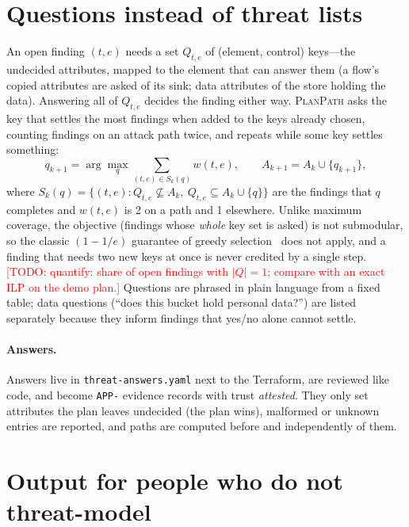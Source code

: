 \documentclass[sigconf,review,anonymous]{acmart}
\newcommand{\sys}{\textsc{PlanPath}\xspace}   %
\newcommand{\todo}[1]{\textcolor{red}{[TODO: #1]}}
\begin{document}
\section{Questions instead of threat lists}\label{sec:questions}

An open finding $(t,e)$ needs a set $Q_{t,e}$ of (element, control) keys---the undecided attributes, mapped to the element
that can answer them (a flow's copied attributes are asked of its sink; data attributes of the store holding the data).
Answering all of $Q_{t,e}$ decides the finding either way. \sys asks the key that settles the most findings when added to
the keys already chosen, counting findings on an attack path twice, and repeats while some key settles something:
\[
q_{k+1} = \arg\max_{q} \sum_{(t,e) \in S_k(q)} w(t,e), \qquad A_{k+1} = A_k \cup \{q_{k+1}\},
\]
where $S_k(q) = \{(t,e) : Q_{t,e} \not\subseteq A_k,\ Q_{t,e} \subseteq A_k \cup \{q\}\}$ are the findings that $q$
completes and $w(t,e)$ is 2 on a path and 1 elsewhere.
Unlike maximum coverage, the objective (findings whose \emph{whole} key set is asked) is not submodular, so the classic
$(1-1/e)$ guarantee of greedy selection~\cite{nemhauser1978} does not apply, and a finding that needs two new keys at once is
never credited by a single step. \todo{quantify: share of open findings with $|Q|=1$; compare with an exact ILP on the demo
plan.} Questions are phrased in plain language from a fixed table; data questions (``does this bucket hold personal
data?'') are listed separately because they inform findings that yes/no alone cannot settle.

\paragraph{Answers.} Answers live in \texttt{threat-answers.yaml} next to the Terraform, are reviewed like code, and become
\texttt{APP-} evidence records with trust \emph{attested}. They only set attributes the plan leaves undecided (the plan wins),
malformed or unknown entries are reported, and paths are computed before and independently of them.

\section{Output for people who do not threat-model}\label{sec:people}
\end{document}
